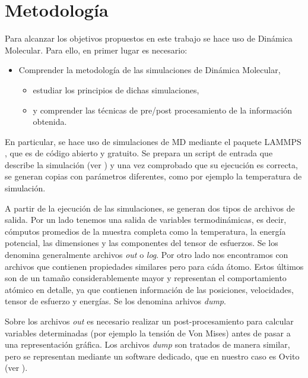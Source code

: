 
\section{Metodología}
\label{S1_5}

Para alcanzar los objetivos propuestos en este trabajo se hace uso de Dinámica Molecular. Para ello, en primer lugar es necesario:

\begin{itemize}
 \item Comprender la metodología de las simulaciones de Dinámica Molecular,
 \begin{itemize}
  \item estudiar los principios de dichas simulaciones,
  \item y comprender las técnicas de pre/post procesamiento de la información obtenida.
 \end{itemize}
\end{itemize}

En particular, se hace uso de simulaciones de MD mediante el paquete LAMMPS \citep{plimpton95}, que es de código abierto y gratuito. Se prepara un script de entrada que describe la simulación (ver ) y una vez comprobado que su ejecución es correcta, se generan copias con parámetros diferentes, como por ejemplo la temperatura de simulación.

A partir de la ejecución de las simulaciones, se generan dos tipos de archivos de salida. Por un lado tenemos una salida de variables termodinámicas, es decir, cómputos promedios de la muestra completa como la temperatura, la energía potencial, las dimensiones y las componentes del tensor de esfuerzos. Se los denomina generalmente archivos \textit{out} o \textit{log}. Por otro lado nos encontramos con archivos que contienen propiedades similares pero para cáda átomo. Estos últimos son de un tamaño considerablemente mayor y representan el comportamiento atómico en detalle, ya que contienen información de las posiciones, velocidades, tensor de esfuerzo y energías. Se los denomina arhivos \textit{dump}.

Sobre los archivos \textit{out} es necesario realizar un post-procesamiento para calcular variables determinadas (por ejemplo la tensión de Von Mises) antes de pasar a una representación gráfica. Los archivos \textit{dump} son tratados de manera similar, pero se representan mediante un  software dedicado, que en nuestro caso es Ovito \citep{stukowski10} (ver ).

